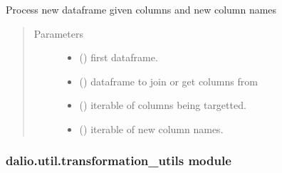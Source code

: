 \documentclass[letterpaper,10pt,english]{sphinxmanual}
\begin{document}

\begin{fulllineitems}
\label{\detokenize{dalio.util:dalio.util.processing_utils.process_new_df}}
Process new dataframe given columns and new column names
\begin{quote}\begin{description}
\item[{Parameters}] \leavevmode\begin{itemize}
\item {} 
 () \textendash{} first dataframe.

\item {} 
 () \textendash{} dataframe to join or get columns from

\item {} 
 () \textendash{} iterable of columns being targetted.

\item {} 
 () \textendash{} iterable of new column names.

\end{itemize}

\end{description}\end{quote}

\end{fulllineitems}



\subsubsection{dalio.util.transformation\_utils module}
\label{\detokenize{dalio.util:module-dalio.util.transformation_utils}}\label{\detokenize{dalio.util:dalio-util-transformation-utils-module}}
\end{document}
